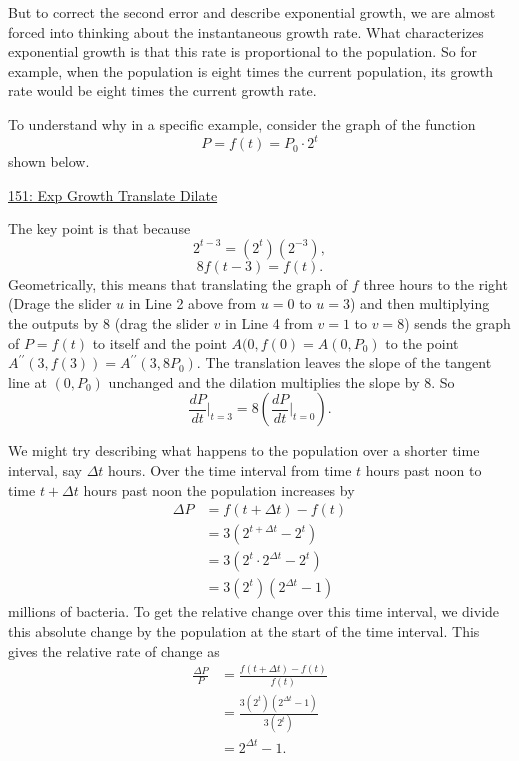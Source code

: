 \documentclass{ximera}
\begin{document}
But to correct the second error and describe exponential growth, we are almost forced into thinking about the instantaneous growth rate. What characterizes exponential growth is that this rate is proportional to the population. So for example, when the population is eight times the current population, its growth rate would be eight times the current growth rate.

To understand why in a specific example, consider the graph of the function
\[
     P = f(t)  = P_0 \cdot 2^t  
\]
shown below. 

\href{https://www.desmos.com/calculator/dmdpvei3d6}{151: Exp Growth Translate Dilate} 
 
\begin{onlineOnly}
    \begin{center}
\end{center}
\end{onlineOnly}



The key point is that because
\[
 2^{t-3} = (2^t)(2^{-3}) , 
\]
\[
      8 f(t-3) = f(t).
\]
Geometrically, this means that translating the graph of $f$ three hours to the right (Drage the slider $u$ in Line 2 above from $u=0$ to $u=3$) and then multiplying the outputs by $8$ (drag the slider $v$ in Line 4 from $v=1$ to $v=8$) sends the graph of $P=f(t)$ to itself and the point $A(0,f(0) = A(0,P_0)$ to the point $A^{\prime\prime}(3,f(3)) = A^{\prime\prime}(3,8P_0)$. The translation leaves the slope of the tangent line at $(0,P_0)$ unchanged and the dilation multiplies the slope by $8$. So
\[
  \frac{dP}{dt}\Big|_{t=3} = 8 \left( \frac{dP}{dt}\Big|_{t=0} \right).
\]




We might try describing what happens to the population over a shorter time interval, say $\Delta t$ hours. Over the time interval from time $t$ hours past noon to time $t+\Delta t$ hours past noon the population increases by 
\begin{align*}
  \Delta P &=  f(t + \Delta t) - f(t)  \\ 
                               &=  3 (2^{t+\Delta t} - 2^t) \\
                               &=  3 (2^t \cdot 2^{\Delta t} - 2^t) \\
                               &=  3 (2^t) (2^{\Delta t} - 1) 
\end{align*}
millions of bacteria. To get the relative change over this time interval, we divide this absolute change by the population at the start of the time interval. This gives the relative rate of change as
\begin{align*}
   \frac{\Delta P}{P} &=  \frac{f(t + \Delta t) - f(t)}{f(t)}  \\ 
                              &= \frac{3 (2^t) (2^{\Delta t} - 1)}{3 (2^t)} \\
                              &= 2^{\Delta t} - 1.
\end{align*}
\end{document}
